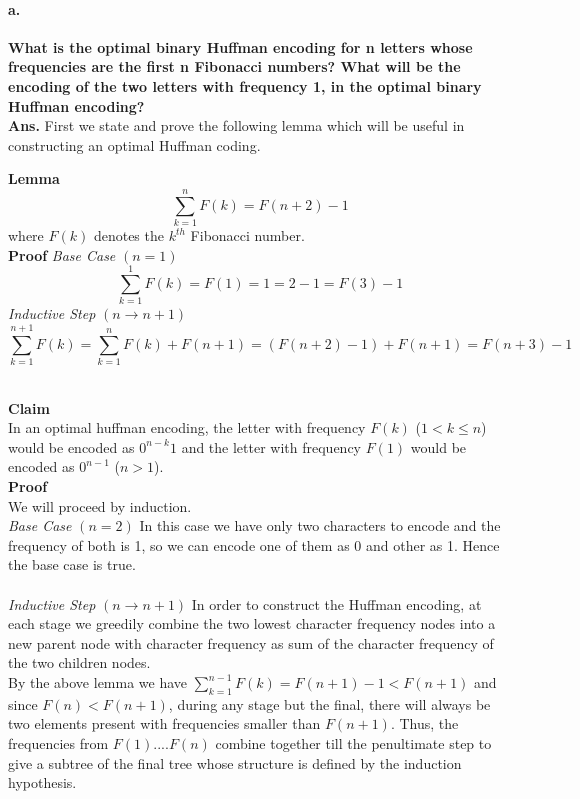 \documentclass[a4paper]{article}
\begin{document}
\paragraph{a.}\textbf{What is the optimal binary Huffman encoding for n letters whose frequencies are the first n Fibonacci numbers? What will be the encoding of the two letters with frequency 1, in the optimal binary Huffman encoding?} \\ 
\textbf{Ans.} {First we state and prove the following lemma which will be useful in constructing an optimal Huffman coding.} \\
\begin{lemma}
\textbf{Lemma }$$\sum_{k=1}^{n} F(k) = F(n+2)-1 $$ where $F(k)$ denotes the $k^{th}$ Fibonacci number. \\
\textbf{Proof} 
\emph{Base Case} $\left(n=1\right)$
$$\sum_{k=1}^{1} F(k) = F(1) = 1 = 2 - 1 = F(3) - 1 $$
\emph{Inductive Step} $\left(n \longrightarrow n+1\right)$
$$\sum_{k=1}^{n+1} F(k) = \sum_{k=1}^{n} F(k) + F(n+1) = (F(n+2)-1)+ F(n+1) = F(n+3)-1$$
\end{lemma}
\\
\textbf{Claim} \\In an optimal huffman encoding, the letter with frequency $F(k)$ ($ 1<k \leq n $) would be encoded as $0^{n-k}1$ and the letter with frequency $F(1)$ would be encoded as $0^{n-1}$ ($ n>1 $). \\
\textbf{Proof} \\
We will proceed by induction. \\
\emph{Base Case} $\left(n=2 \right)$
In this case we have only two characters to encode and the frequency of both is 1, so we can encode one of them as 0 and other as 1. Hence the base case is true. \\ \\
\emph{Inductive Step} $\left(n \longrightarrow n+1\right)$ 
 In order to construct the Huffman encoding, at each stage we greedily combine the two lowest character frequency nodes into a new parent node with character frequency as sum of the character frequency of the two children nodes. \\ By the above lemma we have $\sum_{k=1}^{n-1} F(k) = F(n+1)-1 < F(n+1)$ and since $ F(n)<F(n+1) $, during any stage but the final, there will always be two elements present with frequencies smaller than $F(n+1)$. Thus, the frequencies from $F(1)....F(n)$ combine together till the penultimate step to give a subtree of the final tree whose structure is defined by the induction hypothesis. \\
\end{document}
